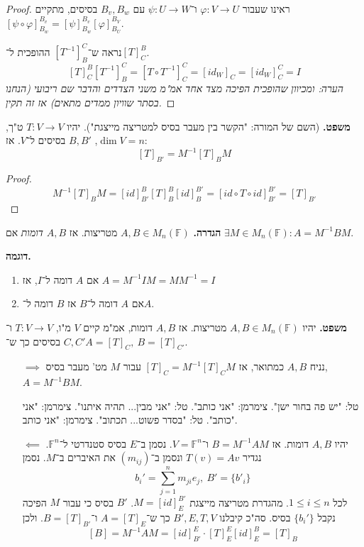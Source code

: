 \documentclass[]{article}
\newcommand\F         {\mathbb{F}}
\newcommand\co        {\colon}
\newcommand\op    {^{-1}}
\renewcommand\phi     {\varphi}
\begin{document}
	\begin{proof}
		ראינו שעבור $\phi \co V \to U$ ו־$\psi \co U \to W$ עם $B_v, B_w$ בסיסים, מתקיים $[\psi \circ \phi]_{B_w}^{B_v} = [\psi]_{B_w}^{B_v}[\phi]_{B_U}^{B_V}$. 
		
		נראה ש־$[T\op]_B^C$ ההופכית ל־‏$[T]_C^B$. 
		\[ [T]^B_C [T\op]_B^C = [T\circ T\op]_C^C = [id_W]_C = [id_W]_C^C = I \]
		\textit{הערה: ומכיוון שהופכית הפיכה מצד אחד אמ"מ משני הצדדים והדבר שם ריבועי (הנחנו בסתר שוויון ממדים מתאים) אז זה תקין. }
	\end{proof}
	
	\textbf{משפט. }(השם של המורה: "הקשר בין מעבר בסיס למטריצה מייצגת"). יהיו $T \co V \to V$ ט"ך, $\dim V = n$, $B, B'$ בסיסים ל־$V$. אז: 
	\[ [T]_{B'} = M\op[T]_BM \]
	\begin{proof}
		\[ M\op[T]_BM = [id]_{B'}^B [T]_B^B [id]_B^{B'} = [id \circ T \circ id]_{B'}^{B'} = [T]_{B'} \]
	\end{proof}
	
	\textbf{הגדרה. }$A, B \in M_n(\F)$ מטריצות. אז $A, B$ \textit{דומות} אם $\exists M \in M_n(\F) \co A = M\op B M$. 
	
	\textbf{דוגמה. }
	\begin{enumerate}
		\item אם $A$ דומה ל־$I$, אז $A = M\op I  M = MM\op = I$
		\item אם $A$ דומה ל־$B$ אז $B$ דומה ל־$A$. 
	\end{enumerate}
	
	\textbf{משפט. }יהיו $A, B \in M_n(\F)$ מטריצות. אז $A, B$ דומות, אמ"מ קיים $V$ מ"ו, $T \co V \to V$ ו־$C, C'$ בסיסים כך ש־$A = [T]_C, \ B = [T]_{C'}$. 
	\begin{enumerate}
		\item[$\implies$] נניח $A, B $ כמתואר, אז $[T]_C = M\op[T]_CM$ עבור $M$ מט' מעבר בסיס, $A = M \op B M$. 
		
		טל: "יש פה בחור ישן". צימרמן: "אני כותב". טל: "אני מבין... תהיה איתנו". צימרמן: "אני כותב". טל: "בסדר פשוט... תכתוב". צימרמן: "אני כותב". 
		\item[$\impliedby$] יהיו $A, B$ דומות. אז $B = M\op A M$ ו־$V = \F^n$. נסמן ב־$E$ בסיס סטנדרטי ל־$\F^n$. נגדיר $T(v) = Av$ ונסמן ב־$(m_{ij})$ את האיברים ב־$M$. נסמן 
		\[ b_i' = \sum_{j = 1}^{n}m_{ji}e_j, \ B' = \{b'_i\} \] לכל $1 \le i \le n$. מהגדרת מטריצה מייצגת $M = [id]_E^{B'}$. $B'$ בסיס כי עבור $M$ הפיכה נקבל $\{b_i'\}$ בסיס. סה"כ קיבלנו $B', E, T, V$ כך ש־$A = [T]_E$ ו־$B = [T]_{B'}$. ולכן
		\[ [B] = M\op A M = [id]_{B'}^E \cdot [T]^E_E [id]_E^B = [T]_B \]
	\end{enumerate}
	
\end{document}
